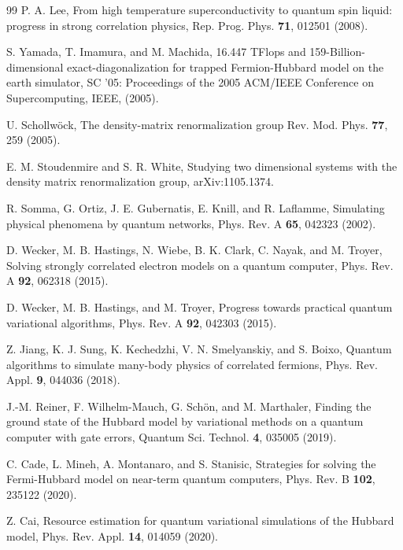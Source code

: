 \documentclass[twocolumn,superscriptaddress,amsmath,amssymb,showpacs,floatfix,preprintnumbers]{revtex4-1}
\begin{document}
\begin{thebibliography}{99}
P. A. Lee,
From high temperature superconductivity to quantum spin liquid: progress in strong correlation physics,
Rep. Prog. Phys. \textbf{71}, 012501 (2008).

S. Yamada, T. Imamura, and M. Machida, 
16.447 TFlops and 159-Billion-dimensional exact-diagonalization for trapped 
Fermion-Hubbard model on the earth simulator,
SC '05: Proceedings of the 2005 ACM/IEEE Conference on Supercomputing, IEEE, (2005).

U. Schollw\"{o}ck,
The density-matrix renormalization group
Rev. Mod. Phys. \textbf{77}, 259 (2005).

E. M. Stoudenmire and S. R. White,
Studying two dimensional systems with the density matrix renormalization group,
arXiv:1105.1374.


R. Somma, G. Ortiz, J. E. Gubernatis, E. Knill, and R. Laflamme,
Simulating physical phenomena by quantum networks,
Phys. Rev. A \textbf{65}, 042323 (2002).

D. Wecker, M. B. Hastings, N. Wiebe, B. K. Clark, C. Nayak, and M. Troyer,
Solving strongly correlated electron models on a quantum computer,
Phys. Rev. A \textbf{92}, 062318 (2015).

D. Wecker, M. B. Hastings, and M. Troyer, 
Progress towards practical quantum variational algorithms,
Phys. Rev. A \textbf{92}, 042303 (2015).

Z. Jiang, K. J. Sung, K. Kechedzhi, V. N. Smelyanskiy, and S. Boixo, 
Quantum algorithms to simulate many-body physics of correlated fermions,
Phys. Rev. Appl. \textbf{9}, 044036 (2018).

J.-M. Reiner, F. Wilhelm-Mauch, G. Sch\"{o}n, and M. Marthaler, 
Finding the ground state of the Hubbard model by variational methods on a quantum computer with gate errors,
Quantum Sci. Technol. \textbf{4}, 035005 (2019).

C. Cade, L. Mineh, A. Montanaro, and S. Stanisic,
Strategies for solving the Fermi-Hubbard model on near-term quantum computers,
Phys. Rev. B \textbf{102}, 235122 (2020).

Z. Cai, 
Resource estimation for quantum variational simulations of the Hubbard model,
Phys. Rev. Appl. \textbf{14}, 014059 (2020).


\end{thebibliography}
\end{document}
